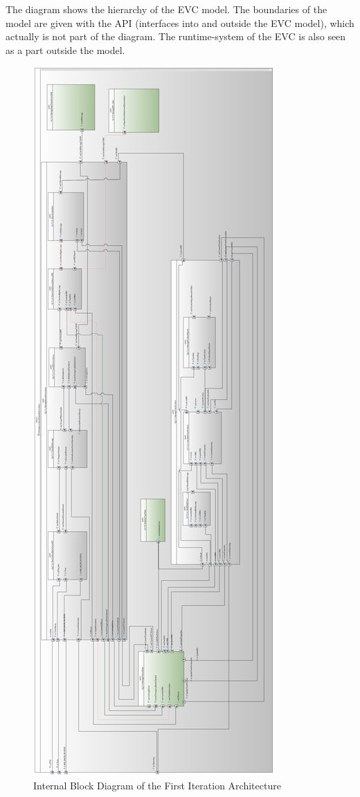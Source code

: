 \documentclass{template/openetcs_article}
\begin{document}
The diagram shows the hierarchy of the EVC model. The boundaries of the model are given with the API (interfaces into and outside the EVC model), which actually is not part of the diagram. The runtime-system of the EVC is also seen as a part outside the model.

\begin{figure}[p]
	\centering
	\includegraphics[scale=0.2]{../images/Block_Class_ManageLocationRelatedInformation_ManageLocationInformationIBD.PNG}
	\caption{Internal Block Diagram of the First Iteration Architecture}
\end{figure}
\end{document}
